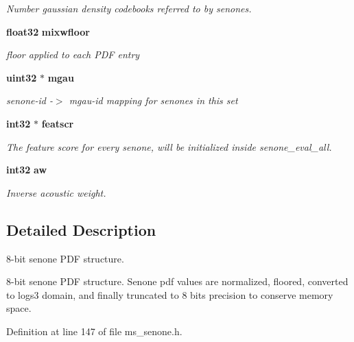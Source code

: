 \begin{DoxyCompactItemize}
\begin{DoxyCompactList}\small\item\em \-Number gaussian density codebooks referred to by senones. \end{DoxyCompactList}\item 
{\bf float32} {\bf mixwfloor}\label{structsenone__t_af3f77493f07dd1740084ea8dc4541cb1}

\begin{DoxyCompactList}\small\item\em floor applied to each \-P\-D\-F entry \end{DoxyCompactList}\item 
{\bf uint32} $\ast$ {\bf mgau}\label{structsenone__t_a5f0eee5a11e7c10b20e0cce10305edfc}

\begin{DoxyCompactList}\small\item\em senone-\/id -\/$>$ mgau-\/id mapping for senones in this set \end{DoxyCompactList}\item 
{\bf int32} $\ast$ {\bf featscr}\label{structsenone__t_a58af20c262d9d633f53c8c1c7e60459e}

\begin{DoxyCompactList}\small\item\em \-The feature score for every senone, will be initialized inside senone\-\_\-eval\-\_\-all. \end{DoxyCompactList}\item 
{\bf int32} {\bf aw}\label{structsenone__t_ad9b17f6aecf056fcea0eaaab0c7d35ca}

\begin{DoxyCompactList}\small\item\em \-Inverse acoustic weight. \end{DoxyCompactList}\end{DoxyCompactItemize}


\subsection{\-Detailed \-Description}
8-\/bit senone \-P\-D\-F structure. 

8-\/bit senone \-P\-D\-F structure. \-Senone pdf values are normalized, floored, converted to logs3 domain, and finally truncated to 8 bits precision to conserve memory space. 

\-Definition at line 147 of file ms\-\_\-senone.\-h.



